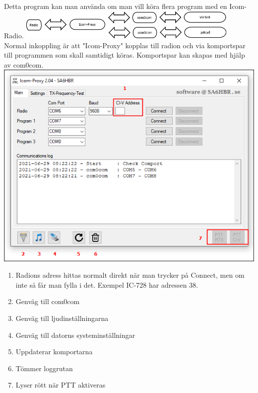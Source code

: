 \documentclass[a4paper]{article}
\begin{document}
Detta program kan man använda om man vill köra flera program med en Icom-Radio.
\newline
\newline
\includegraphics[width=0.8\textwidth]{../image/Diagram1.png}\\[0.2cm] 
Normal inkoppling är att "Icom-Proxy" kopplas till radion och via komportspar till programmen som skall samtidigt köras.
Komportspar kan skapas med hjälp av com0com.
\newline
\newline
\includegraphics[width=1\textwidth]{../image/Icom_Proxy_main.png}\\[0.1cm] 


\begin{enumerate}   
\item Radions adress hittas normalt direkt när man trycker på Connect, men om inte så får man fylla i det. Exempel IC-728 har adressen 38.
\item Genväg till com0com
\item Genväg till ljudinställningarna
\item Genväg till datorns systeminställningar
\item Uppdaterar komportarna
\item Tömmer loggrutan
\item Lyser rött när PTT aktiveras
\end{enumerate}  
\end{document}

